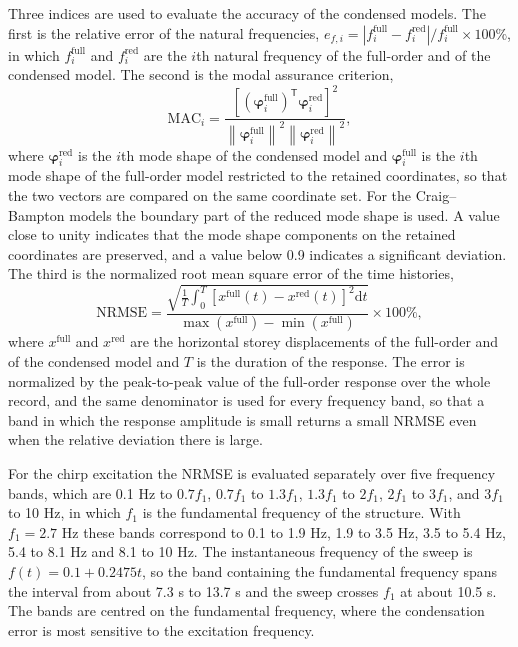 \documentclass[11pt,a4paper]{article}
\numberwithin{equation}{section}
\begin{document}
Three indices are used to evaluate the accuracy of the condensed models. The first is the relative error of the natural frequencies, \(e_{f,i}=|f_{i}^{\mathrm{full}}-f_{i}^{\mathrm{red}}|/f_{i}^{\mathrm{full}}\times100\%\), in which \(f_{i}^{\mathrm{full}}\) and \(f_{i}^{\mathrm{red}}\) are the \(i\)th natural frequency of the full-order and of the condensed model. The second is the modal assurance criterion,
\begin{equation}
	\mathrm{MAC}_{i}=
	\frac{\left[\left(\bm{\varphi}_{i}^{\mathrm{full}}\right)^{\mathsf{T}}
		\bm{\varphi}_{i}^{\mathrm{red}}\right]^{2}}
	{\left\|\bm{\varphi}_{i}^{\mathrm{full}}\right\|^{2}
		\left\|\bm{\varphi}_{i}^{\mathrm{red}}\right\|^{2}},
	\label{eq:mac}
\end{equation}
where \(\bm{\varphi}_{i}^{\mathrm{red}}\) is the \(i\)th mode shape of the condensed model and \(\bm{\varphi}_{i}^{\mathrm{full}}\) is the \(i\)th mode shape of the full-order model restricted to the retained coordinates, so that the two vectors are compared on the same coordinate set. For the Craig--Bampton models the boundary part of the reduced mode shape is used. A value close to unity indicates that the mode shape components on the retained coordinates are preserved, and a value below 0.9 indicates a significant deviation. The third is the normalized root mean square error of the time histories,
\begin{equation}
	\mathrm{NRMSE}=
	\frac{\displaystyle\sqrt{\frac{1}{T}\int_{0}^{T}
			\left[x^{\mathrm{full}}(t)-x^{\mathrm{red}}(t)\right]^{2}\mathrm{d}t}}
	{\max\left(x^{\mathrm{full}}\right)-\min\left(x^{\mathrm{full}}\right)}
	\times100\%,
	\label{eq:nrmse}
\end{equation}
where \(x^{\mathrm{full}}\) and \(x^{\mathrm{red}}\) are the horizontal storey displacements of the full-order and of the condensed model and \(T\) is the duration of the response. The error is normalized by the peak-to-peak value of the full-order response over the whole record, and the same denominator is used for every frequency band, so that a band in which the response amplitude is small returns a small NRMSE even when the relative deviation there is large.

For the chirp excitation the NRMSE is evaluated separately over five frequency bands, which are 0.1 Hz to \(0.7f_{1}\), \(0.7f_{1}\) to \(1.3f_{1}\), \(1.3f_{1}\) to \(2f_{1}\), \(2f_{1}\) to \(3f_{1}\), and \(3f_{1}\) to 10 Hz, in which \(f_{1}\) is the fundamental frequency of the structure. With \(f_{1}=2.7\) Hz these bands correspond to 0.1 to 1.9 Hz, 1.9 to 3.5 Hz, 3.5 to 5.4 Hz, 5.4 to 8.1 Hz and 8.1 to 10 Hz. The instantaneous frequency of the sweep is \(f(t)=0.1+0.2475t\), so the band containing the fundamental frequency spans the interval from about 7.3 s to 13.7 s and the sweep crosses \(f_{1}\) at about 10.5 s. The bands are centred on the fundamental frequency, where the condensation error is most sensitive to the excitation frequency.
\end{document}
